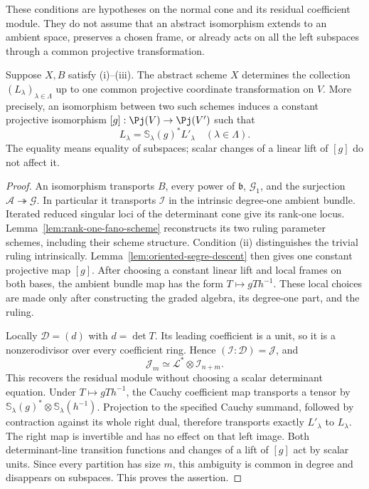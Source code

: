 These conditions are hypotheses on the normal cone and its residual
coefficient module.  They do not assume that an abstract isomorphism
extends to an ambient space, preserves a chosen frame, or already acts
on all the left subspaces through a common projective transformation.

\begin{theorem}
\label{thm:structural-coefficient-reconstruction}
Suppose \(X,B\) satisfy \textup{(i)--(iii)}.  The abstract scheme
\(X\) determines the collection \((L_\lambda)_{\lambda\in\Lambda}\)
up to one common projective coordinate transformation on \(V\).
More precisely, an isomorphism between two such schemes induces a
constant projective isomorphism \([g]:\Pj(V)\to\Pj(V')\) such that
\[
                L_\lambda=\mathbb S_\lambda(g)^*L'_\lambda
                       \quad(\lambda\in\Lambda).
\]
The equality means equality of subspaces; scalar changes of a linear
lift of \([g]\) do not affect it.
\end{theorem}
\begin{proof}
An isomorphism transports \(B\), every power of \(\mathfrak b\),
\(\mathcal G_1\), and the surjection
\(\mathcal A\twoheadrightarrow\mathcal G\).  In particular it
transports \(\mathcal I\) in the intrinsic degree-one ambient
bundle.  Iterated reduced singular loci of the determinant cone give
its rank-one locus.  Lemma~\ref{lem:rank-one-fano-scheme} reconstructs
its two ruling parameter schemes, including their scheme structure.
Condition \textup{(ii)} distinguishes the trivial ruling intrinsically.
Lemma~\ref{lem:oriented-segre-descent} then gives one constant
projective map \([g]\).  After choosing a constant linear lift and
local frames on both bases, the ambient bundle map has the form
\(T\mapsto gTh^{-1}\).  These local choices are made only after
constructing the graded algebra, its degree-one part, and the ruling.

Locally \(\mathcal D=(d)\) with \(d=\det T\).  Its leading
coefficient is a unit, so it is a nonzerodivisor over every coefficient
ring.  Hence \((\mathcal I:\mathcal D)=\mathcal J\), and
\[
 \mathcal J_m\simeq\mathcal L^*\otimes\mathcal I_{n+m}.
\]
This recovers the residual module without choosing a scalar determinant
equation.  Under \(T\mapsto gTh^{-1}\), the Cauchy coefficient
map transports a tensor by
\(\mathbb S_\lambda(g)^*\otimes\mathbb S_\lambda(h^{-1})\).
Projection to the specified Cauchy summand, followed by contraction
against its whole right dual, therefore transports exactly
\(L'_\lambda\) to \(L_\lambda\).  The right map is invertible
and has no effect on that left image.  Both determinant-line transition
functions and changes of a lift of \([g]\) act by scalar units.
Since every partition has size \(m\), this ambiguity is common
in degree and disappears on subspaces.  This proves the assertion.
\end{proof}

